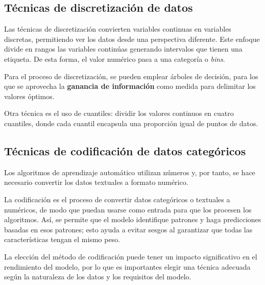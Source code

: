 \subsection{Técnicas de discretización de datos}
Las técnicas de discretización convierten variables continuas en variables discretas, permitiendo ver los datos desde una perspectiva diferente. Este enfoque divide en rangos las variables continúas generando intervalos que tienen una etiqueta. De esta forma, el valor numérico pasa a una categoría o \textit{bins}.

Para el proceso de discretización, se pueden emplear árboles de decisión, para los que se aprovecha la \textbf{ganancia de información} como medida para delimitar los valores óptimos.

Otra técnica es el uso de cuantiles: dividir los valores continuos en cuatro cuantiles, donde cada cuantil encapsula una proporción igual de puntos de datos. 

\subsection{Técnicas de codificación de datos categóricos}
Los algoritmos de aprendizaje automático utilizan números y, por tanto, se hace necesario convertir los datos textuales a formato numérico.

La codificación es el proceso de convertir datos categóricos o textuales a numéricos, de modo que puedan usarse como entrada para que los procesen los algoritmos. Así, se permite que el modelo identifique patrones y haga predicciones basadas en esos patrones; esto ayuda a evitar sesgos al garantizar que todas las características tengan el mismo peso.

La elección del método de codificación puede tener un impacto significativo en el rendimiento del modelo, por lo que es importantes elegir una técnica adecuada según la naturaleza de los datos y los requisitos del modelo.

